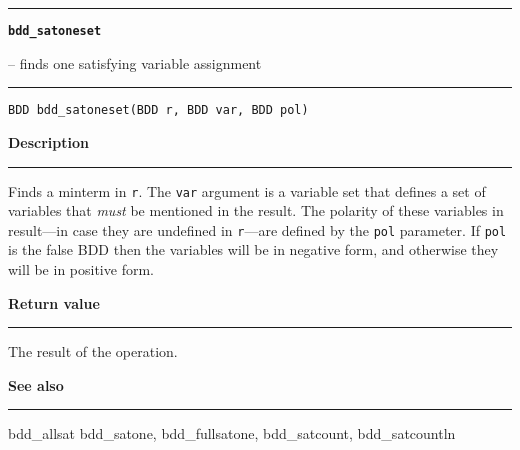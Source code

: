 \begin{minipage}{\textwidth}

\noindent\begin{minipage}{\textwidth}
\rule{\textwidth}{0.5mm}
{\tt\bf bdd\_satoneset }
\--- finds one satisfying variable assignment  \hspace{\fill}
\\\rule[1.5ex]{\textwidth}{0.5mm}
\end{minipage}

\noindent\begin{verbatim}
BDD bdd_satoneset(BDD r, BDD var, BDD pol) 
\end{verbatim}

\vspace{\parsep}\noindent
{\bf Description}\\\rule[1.5ex]{\textwidth}{0.2mm}\vspace{-1.5ex}\setlength{\parindent}{1em}
Finds a minterm in {\tt r}. The {\tt var} argument is a
           variable set that defines a set of variables that {\em must} be
	   mentioned in the result. The polarity of these variables in
	   result---in case they are undefined in {\tt r}---are defined
	   by the {\tt pol} parameter. If {\tt pol} is the false BDD then
	   the variables will be in negative form, and otherwise they will
	   be in positive form. 

\setlength{\parindent}{0em}\vspace{\parsep}\vspace{\baselineskip}\noindent
{\bf Return value}\\\rule[1.5ex]{\textwidth}{0.2mm}\vspace{-1.5ex}
The result of the operation. 

\vspace{\parsep}\vspace{\baselineskip}\noindent
{\bf See also}\\\rule[1.5ex]{\textwidth}{0.2mm}\vspace{-1.5ex}
bdd\_allsat bdd\_satone, bdd\_fullsatone, bdd\_satcount, bdd\_satcountln 
\end{minipage}
\vspace{8ex}
